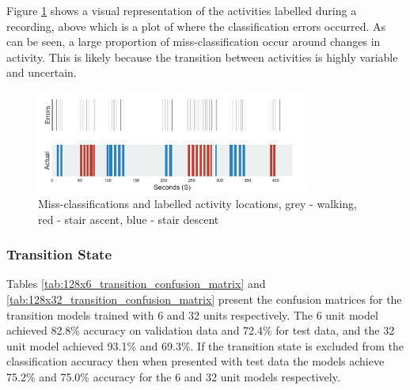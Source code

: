 \documentclass[sensors,article,submit,moreauthors,pdftex]{Definitions/mdpi}
\begin{document}
Figure \ref{fig:missclassification} shows a visual representation of the activities labelled during a recording, above which is a plot of where the classification errors occurred. As can be seen, a large proportion of miss-classification occur around changes in activity. This is likely because the transition between activities is highly variable and uncertain.

\begin{figure}[!htb]
    \centering
    \includegraphics[width=0.8\textwidth]{Figures/results/location_of_errors.jpg}
    \caption{Miss-classifications and labelled activity locations, grey - walking, red - stair ascent, blue - stair descent}
    \label{fig:missclassification}
\end{figure}

\subsubsection{Transition State}
Tables \ref{tab:128x6_transition_confusion_matrix} and \ref{tab:128x32_transition_confusion_matrix} present the confusion matrices for the transition models trained with 6 and 32 units respectively. The 6 unit model achieved 82.8\% accuracy on validation data and 72.4\% for test data, and the 32 unit model achieved 93.1\% and 69.3\%. If the transition state is excluded from the classification accuracy then when presented with test data the models achieve 75.2\% and 75.0\% accuracy for the 6 and 32 unit models respectively.
\end{document}
